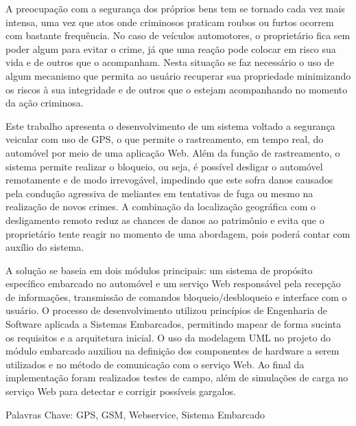 
A preocupação com a segurança dos próprios bens tem se tornado cada vez mais intensa, uma vez que atos onde criminosos praticam roubos ou furtos ocorrem com bastante frequência. No caso de veículos automotores, o proprietário fica sem poder algum para evitar o crime, já que uma reação pode colocar em risco sua vida e de outros que o acompanham. Nesta situação se faz necessário o uso de algum mecanismo que permita ao usuário recuperar sua propriedade minimizando os riscos à sua integridade e de outros que o estejam acompanhando no momento da ação criminosa.

Este trabalho apresenta o desenvolvimento de um sistema voltado a segurança veicular com uso de GPS, o que permite o rastreamento, em tempo real, do automóvel por meio de uma aplicação Web. Além da função de rastreamento, o sistema permite realizar o bloqueio, ou seja, é possível desligar o automóvel remotamente e de modo irrevogável, impedindo que este sofra danos causados pela condução agressiva de meliantes em tentativas de fuga ou mesmo na realização de novos crimes. A combinação da localização geográfica com o desligamento remoto reduz as chances de danos ao patrimônio e evita que o proprietário tente reagir no momento de uma abordagem, pois poderá contar com auxílio do sistema.

A solução se baseia em dois módulos principais: um sistema de propósito específico embarcado no automóvel e um serviço Web responsável pela recepção de informações, transmissão de comandos bloqueio/desbloqueio e interface com o usuário. O processo de desenvolvimento utilizou princípios de Engenharia de Software aplicada a Sistemas Embarcados, permitindo mapear de forma sucinta os requisitos e a arquitetura inicial. O uso da modelagem UML no projeto do módulo embarcado auxiliou na definição dos componentes de hardware a serem utilizados e no método de comunicação com o serviço Web. Ao final da implementação foram realizados testes de campo, além de simulações de carga no serviço Web para detectar e corrigir possíveis gargalos. 


Palavras Chave: GPS, GSM, Webservice, Sistema Embarcado
